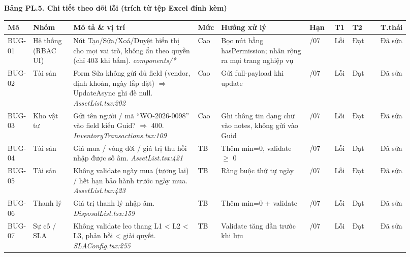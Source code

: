\begin{landscape}{\scriptsize\singlespacing\renewcommand{\arraystretch}{1.2}\setlength{\LTleft}{0pt}\setlength{\LTright}{0pt}
\textbf{Bảng PL.5. Chi tiết theo dõi lỗi (trích từ tệp Excel đính kèm)}\par\smallskip
\begin{longtable}{|>{\raggedright\arraybackslash}p{0.045\linewidth}|>{\raggedright\arraybackslash}p{0.10\linewidth}|>{\raggedright\arraybackslash}p{0.31\linewidth}|>{\raggedright\arraybackslash}p{0.055\linewidth}|>{\raggedright\arraybackslash}p{0.22\linewidth}|>{\raggedright\arraybackslash}p{0.06\linewidth}|c|>{\raggedright\arraybackslash}p{0.075\linewidth}|>{\raggedright\arraybackslash}p{0.06\linewidth}|}
\hline
\rowcolor{gray!20}\textbf{Mã} & \textbf{Nhóm} & \textbf{Mô tả \& vị trí} & \textbf{Mức} & \textbf{Hướng xử lý} & \textbf{Hạn} & \textbf{T1} & \textbf{T2} & \textbf{T.thái} \\ \hline
\endhead
BUG-01 & Hệ thống (RBAC UI) & Nút Tạo/Sửa/Xoá/Duyệt hiển thị cho mọi vai trò, không ẩn theo quyền (chỉ 403 khi bấm). \textit{components/*} & Cao & Bọc nút bằng hasPermission; nhân rộng ra mọi trang nghiệp vụ & 22/07 & Lỗi & Đạt & Đã sửa \\ \hline
BUG-02 & Tài sản & Form Sửa không gửi đủ field (vendor, định khoản, ngày lắp đặt) $\Rightarrow$ UpdateAsync ghi đè null. \textit{AssetList.tsx:202} & Cao & Gửi full-payload khi update & 22/07 & Lỗi & Đạt & Đã sửa \\ \hline
BUG-03 & Kho vật tư & Gửi tên người / mã ``WO-2026-0098'' vào field kiểu Guid? $\Rightarrow$ 400. \textit{InventoryTransactions.tsx:109} & Cao & Ghi thông tin dạng chữ vào notes, không gửi vào Guid & 22/07 & Lỗi & Đạt & Đã sửa \\ \hline
BUG-04 & Tài sản & Giá mua / vòng đời / giá trị thu hồi nhập được số âm. \textit{AssetList.tsx:421} & TB & Thêm min=0, validate $\geq$ 0 & 25/07 & Lỗi & Đạt & Đã sửa \\ \hline
BUG-05 & Tài sản & Không validate ngày mua (tương lai) / hết hạn bảo hành trước ngày mua. \textit{AssetList.tsx:423} & TB & Ràng buộc thứ tự ngày & 25/07 & Lỗi & Đạt & Đã sửa \\ \hline
BUG-06 & Thanh lý & Giá trị thanh lý nhập âm. \textit{DisposalList.tsx:159} & TB & Thêm min=0 + validate & 25/07 & Lỗi & Đạt & Đã sửa \\ \hline
BUG-07 & Sự cố / SLA & Không validate leo thang L1 < L2 < L3, phản hồi < giải quyết. \textit{SLAConfig.tsx:255} & TB & Validate tăng dần trước khi lưu & 25/07 & Lỗi & Đạt & Đã sửa \\ \hline

\end{longtable}}
\end{landscape}
